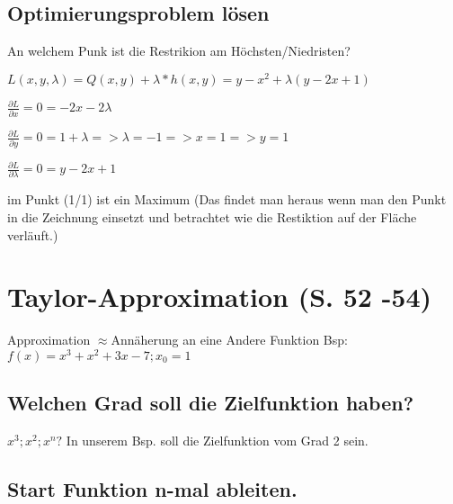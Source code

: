 \documentclass[a4paper, 12pt]{article}
\begin{document}
				\subsection{Optimierungsproblem lösen}

				An welchem Punk ist die Restrikion am Höchsten/Niedristen? \newline

				$L(x,y,\lambda) = Q(x,y) + \lambda * h(x,y) = y-x^2+\lambda(y-2x+1)$ \newline

				\begin{compactenum}[(1)] 
				\item $\frac{\partial L}{\partial x} = 0 = -2x-2\lambda$ 
				\item $\frac{\partial L}{\partial y} = 0 = 1 + \lambda => \lambda = -1 => x = 1
				=> y = 1$
				\item $\frac{\partial L}{\partial \lambda} = 0 = y-2x+1$ \newline
				\end{compactenum}

	im Punkt (1/1) ist ein Maximum \newline
\newline (Das findet man heraus wenn man den Punkt in die Zeichnung einsetzt und betrachtet wie die Restiktion auf der Fläche verläuft.)

	\section { Taylor-Approximation (S. 52 -54)}

	Approximation $\approx $Annäherung an eine Andere Funktion \newline 
	\newline Bsp: $f(x) = x^3 + x^2 + 3x - 7 ; x_0 = 1$ 	

	\subsection {Welchen Grad soll die Zielfunktion haben?}

	$x^3; x^2; x^n ?$\newline
	\newline In unserem Bsp. soll die Zielfunktion vom Grad 2 sein.


	\subsection {Start Funktion n-mal ableiten.}
\end{document}
